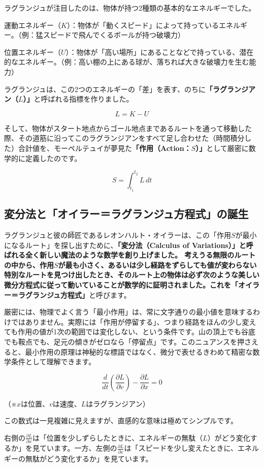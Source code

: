ラグランジュが注目したのは、物体が持つ2種類の基本的なエネルギーでした。

運動エネルギー（\(K\)）：物体が「動くスピード」によって持っているエネルギー。（例：猛スピードで飛んでくるボールが持つ破壊力）

位置エネルギー（\(U\)）：物体が「高い場所」にあることなどで持っている、潜在的なエネルギー。（例：高い棚の上にある球が、落ちれば大きな破壊力を生む能力）

ラグランジュは、この2つのエネルギーの「差」を表す、のちに\textbf{「ラグランジアン（\(L\)）」}と呼ばれる指標を作りました。

\[
L=K-U
\]

そして、物体がスタート地点からゴール地点まであるルートを通って移動した際、その道筋に沿ってこのラグランジアンをすべて足し合わせた（時間積分した）合計値を、モーペルテュイが夢見た\textbf{「作用（Action：\(S\)）」}として厳密に数学的に定義したのです。

\[
S=\int_{t_1}^{t_2}L\,dt
\]

\subsection{変分法と「オイラー＝ラグランジュ方程式」の誕生}

ラグランジュと彼の師匠であるレオンハルト・オイラーは、この「作用\(S\)が最小になるルート」を探し出すために、\textbf{「変分法（Calculus of Variations）」と呼ばれる全く新しい魔法のような数学を創り上げました。 考えうる無限のルートの中から、作用\(S\)が最も小さく、あるいは少し経路をずらしても値が変わらない特別なルートを見つけ出したとき、そのルート上の物体は必ず次のような美しい微分方程式に従って動いていることが数学的に証明されました。これを「オイラー＝ラグランジュ方程式」}と呼びます。

厳密には、物理でよく言う「最小作用」は、常に文字通りの最小値を意味するわけではありません。実際には「作用が停留する」、つまり経路をほんの少し変えても作用の値が1次の範囲では変化しない、という条件です。山の頂上でも谷底でも鞍点でも、足元の傾きがゼロなら「停留点」です。このニュアンスを押さえると、最小作用の原理は神秘的な標語ではなく、微分で表せるきわめて精密な数学条件として理解できます。

\[
\frac{d}{dt}\left(\frac{\partial L}{\partial v}\right)-\frac{\partial L}{\partial x}=0
\]

（※\(x\)は位置、\(v\)は速度、\(L\)はラグランジアン）

この数式は一見複雑に見えますが、直感的な意味は極めてシンプルです。

右側の\(\frac{\partial L}{\partial x}\)は「位置を少しずらしたときに、エネルギーの無駄（\(L\)）がどう変化するか」を見ています。一方、左側の\(\frac{\partial L}{\partial v}\)は「スピードを少し変えたときに、エネルギーの無駄がどう変化するか」を見ています。

